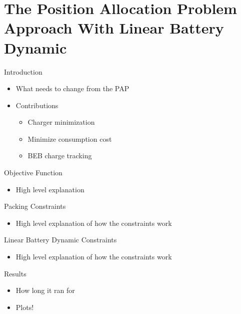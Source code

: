 \documentclass[bigger]{beamer}
\begin{document}
\section{The Position Allocation Problem Approach With Linear Battery Dynamic}
\label{sec:orgd798e25}
\begin{frame}[label={sec:org956b6d6}]{Introduction}
\begin{itemize}
\item What needs to change from the PAP
\item Contributions
\begin{itemize}
\item Charger minimization
\item Minimize consumption cost
\item BEB charge tracking
\end{itemize}
\end{itemize}
\end{frame}
\begin{frame}[label={sec:orga9e83bb}]{Objective Function}
\begin{itemize}
\item High level explanation
\end{itemize}
\end{frame}
\begin{frame}[label={sec:org389ed8e}]{Packing Constraints}
\begin{itemize}
\item High level explanation of how the constraints work
\end{itemize}
\end{frame}
\begin{frame}[label={sec:orga10b90b}]{Linear Battery Dynamic Constraints}
\begin{itemize}
\item High level explanation of how the constraints work
\end{itemize}
\end{frame}
\begin{frame}[label={sec:org1e8eeff}]{Results}
\begin{itemize}
\item How long it ran for
\item Plots!
\end{itemize}
\end{frame}
\end{document}
